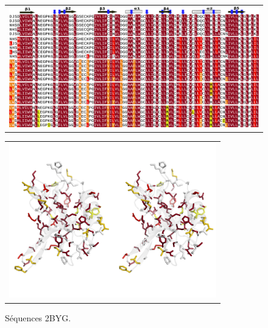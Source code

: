     \clearpage

\begin{landscape}

   \begin{figure}[t]
     \centering
     \begin{tabular}{c}
       \includegraphics[width=14cm]{boost_hydro/modelA/align2BYG.png} \\
     \end{tabular}
\label{result:PDZ_seed}
   \end{figure}

   \begin{figure}[t]
     \centering
     \begin{tabular}{c}
       \includegraphics[width=9cm]{boost_hydro/modelA/structure2BYG.png} \\
     \end{tabular}

     \caption{\small Séquences 2BYG.}

\label{result:PDZ_seed}
   \end{figure}

\end{landscape}


